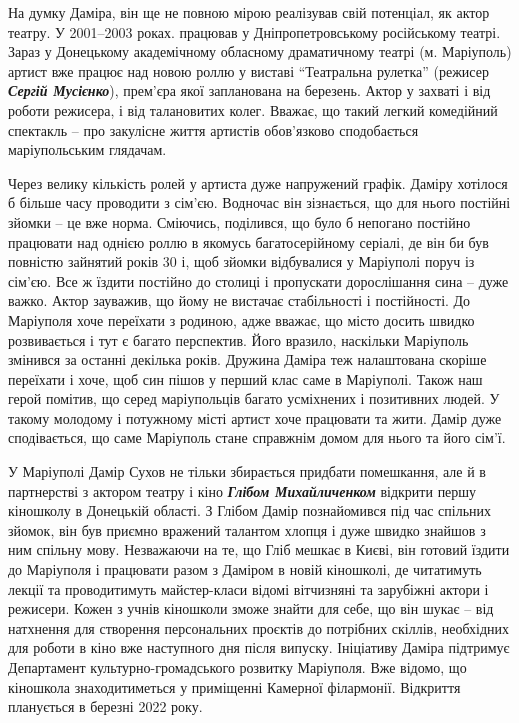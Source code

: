 
На думку Даміра, він ще не повною мірою реалізував свій потенціал, як актор
театру. У 2001–2003 роках. працював у Дніпропетровському російському театрі.
Зараз у Донецькому академічному обласному драматичному театрі (м. Маріуполь)
артист вже працює над новою роллю у виставі \enquote{Театральна рулетка} (режисер
\emph{\textbf{Сергій Мусієнко}}), прем'єра якої запланована на березень. Актор у захваті і від
роботи режисера, і від талановитих колег. Вважає, що такий легкий комедійний
спектакль – про закулісне життя артистів обов'язково сподобається
маріупольським глядачам.

Через велику кількість ролей у артиста дуже напружений графік. Даміру хотілося
б більше часу проводити з сім'єю. Водночас він зізнається, що для нього
постійні зйомки – це вже норма. Сміючись, поділився, що було б непогано
постійно працювати над однією роллю в якомусь багатосерійному серіалі, де він
би був повністю зайнятий років 30 і, щоб зйомки відбувалися у Маріуполі поруч
із сім'єю. Все ж їздити постійно до столиці і пропускати дорослішання сина –
дуже важко. Актор зауважив, що йому не вистачає стабільності і постійності. До
Маріуполя хоче переїхати з родиною, адже вважає, що місто досить швидко
розвивається і тут є багато перспектив. Його вразило, наскільки Маріуполь
змінився за останні декілька років. Дружина Даміра теж налаштована скоріше
переїхати і хоче, щоб син пішов у перший клас саме в Маріуполі.  Також наш
герой помітив, що серед маріупольців багато усміхнених і позитивних людей. У
такому молодому і потужному місті артист хоче працювати та жити. Дамір дуже
сподівається, що саме Маріуполь стане справжнім домом для нього та його сім'ї.


У Маріуполі Дамір Сухов не тільки збирається придбати помешкання, але й в
партнерстві з актором театру і кіно \emph{\textbf{Глібом Михайличенком}} відкрити першу
кіношколу в Донецькій області. З Глібом Дамір познайомився під час спільних
зйомок, він був приємно вражений талантом хлопця і дуже швидко знайшов з ним
спільну мову. Незважаючи на те, що Гліб мешкає в Києві, він готовий їздити до
Маріуполя і працювати разом з Даміром в новій кіношколі, де читатимуть лекції
та проводитимуть майстер-класи відомі вітчизняні та зарубіжні актори і
режисери. Кожен з учнів кіношколи зможе знайти для себе, що він шукає – від
натхнення для створення персональних проєктів до потрібних скіллів, необхідних
для роботи в кіно вже наступного дня після випуску. Ініціативу Даміра
підтримує Департамент культурно-громадського розвитку Маріуполя. Вже відомо,
що кіношкола знаходитиметься у приміщенні Камерної філармонії. Відкриття
планується в березні 2022 року.

